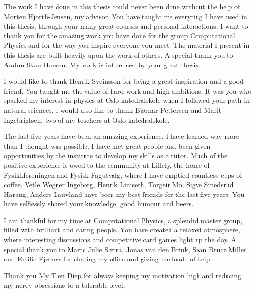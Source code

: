 \documentclass[twoside,english]{uiofysmaster}
\begin{document}
\begin{acknowledgements}
	The work I have done in this thesis could never been done without the help of Morten Hjorth-Jensen, my advisor. You have taught me everyting I have used in this thesis, through your many great courses and personal interactions. I want to thank you for the amazing work you have done for the group Computational Physics and for the way you inspire everyone you meet. The material I present in this thesis are built heavily upon the work of others. A special thank you to Audun Skau Hansen. My work is influenced by your great thesis. 

	I would like to thank Henrik Sveinsson for being a great inspiration and a good friend. You taught me the value of hard work and high ambitions. It was you who sparked my interest in physics at Oslo katedralskole when I followed your path in natural sciences. I would also like to thank Bj\o rnar Pettersen and Marit Ingebrigtsen, two of my teachers at Oslo katedralskole. 

	The last five years have been an amazing experience. I have learned way more than I thought was possible, I have met great people and been given opportunities by the institute to develop my skills as a tutor. Much of the positive experience is owed to the community at Lillefy, the home of Fysikkforeningen and Fysisk Fagutvalg, where I have emptied countless cups of coffee. Vetle Wegner Ingeberg, Henrik Limseth, Torgeir Mo, Sigve Smedsrud Harang, Anders Lauvland have been my best friends for the last five years. You have selflessly shared your knowledge, good humour and beers. 

	I am thankful for my time at Computational Physics, a splendid master group, filled with brilliant and caring people. You have created a relaxed atmosphere, where interesting discussions and competitive card games light up the day. A special thank you to Marte Julie Sætra, Jonas van den Brink, Sean Bruce Miller and Emilie Fj\o rner for sharing my office and giving me loads of help. 

	Thank you My Tien Diep for always keeping my motivation high and reducing my nerdy obsessions to a tolerable level.

\end{acknowledgements}


\tableofcontents
\end{document}
